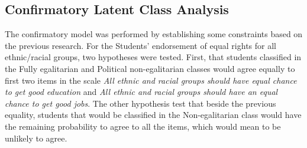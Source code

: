 \documentclass[12pt,a4paper,oneside]{reedthesis}
\begin{document}
\hypertarget{confirmatory-latent-class-analysis-1}{%
\subsection{Confirmatory Latent Class Analysis}\label{confirmatory-latent-class-analysis-1}}

The confirmatory model was performed by establishing some constraints based on the previous research. For the Students' endorsement of equal rights for all ethnic/racial groups, two hypotheses were tested. First, that students classified in the Fully egalitarian and Political non-egalitarian classes would agree equally to first two items in the scale \emph{All ethnic and racial groups should have equal chance to get good education} and \emph{All ethnic and racial groups should have an equal chance to get good jobs}.
The other hypothesis test that beside the previous equality, students that would be classified in the Non-egalitarian class would have the remaining probability to agree to all the items, which would mean to be unlikely to agree.
\end{document}
